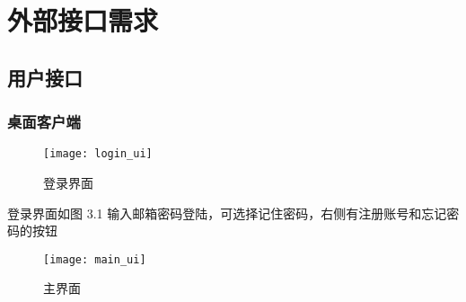 \section{外部接口需求}
\subsection{用户接口}
% 
% 
% 
% 
% 


\subsubsection{桌面客户端}

\begin{figure}[h]
	\centering
	\texttt{[image: login\_ui]}
	\caption{登录界面} \label{fig:login_ui}
\end{figure}

登录界面如图 3.1
输入邮箱密码登陆，可选择记住密码，右侧有注册账号和忘记密码的按钮

\begin{figure}[h]
	\centering
	\texttt{[image: main\_ui]}
	\caption{主界面} \label{fig:main_ui}
\end{figure}


